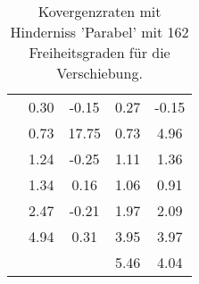 \begin{table}
\begin{tabular}{c|cc|cc|}
\multicolumn{1}{|c|}{} & \multicolumn{1}{|c|}{      0.30} & \multicolumn{1}{|c|}{     -0.15} & \multicolumn{1}{|c|}{      0.27} & \multicolumn{1}{|c|}{     -0.15} \\ 
\multicolumn{1}{|c|}{} & \multicolumn{1}{|c|}{      0.73} & \multicolumn{1}{|c|}{     17.75} & \multicolumn{1}{|c|}{      0.73} & \multicolumn{1}{|c|}{      4.96} \\ 
\multicolumn{1}{|c|}{} & \multicolumn{1}{|c|}{      1.24} & \multicolumn{1}{|c|}{     -0.25} & \multicolumn{1}{|c|}{      1.11} & \multicolumn{1}{|c|}{      1.36} \\ 
\multicolumn{1}{|c|}{} & \multicolumn{1}{|c|}{      1.34} & \multicolumn{1}{|c|}{      0.16} & \multicolumn{1}{|c|}{      1.06} & \multicolumn{1}{|c|}{      0.91} \\ 
\multicolumn{1}{|c|}{} & \multicolumn{1}{|c|}{      2.47} & \multicolumn{1}{|c|}{     -0.21} & \multicolumn{1}{|c|}{      1.97} & \multicolumn{1}{|c|}{      2.09} \\ 
\multicolumn{1}{|c|}{} & \multicolumn{1}{|c|}{      4.94} & \multicolumn{1}{|c|}{      0.31} & \multicolumn{1}{|c|}{      3.95} & \multicolumn{1}{|c|}{      3.97} \\ 
\multicolumn{1}{|c|}{} & \multicolumn{1}{|c|}{} & \multicolumn{1}{|c|}{} & \multicolumn{1}{|c|}{      5.46} & \multicolumn{1}{|c|}{      4.04} \\ 
\hline 
\end{tabular}\caption{Kovergenzraten mit Hinderniss 'Parabel' mit 162 Freiheitsgraden für die Verschiebung.}\label{tab:Rate_Parabel_level2}
\end{table} 
